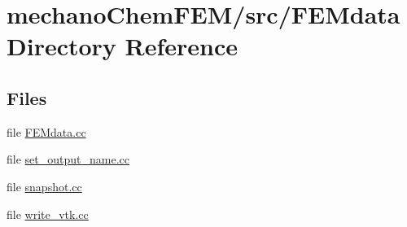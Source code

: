 \section{mechano\-Chem\-F\-E\-M/src/\-F\-E\-Mdata Directory Reference}
\label{dir_97da76cb69d6b32226d05cfade0f3c97}
\subsection*{Files}
\begin{DoxyCompactItemize}
\item 
file \hyperlink{_f_e_mdata_8cc}{F\-E\-Mdata.\-cc}
\item 
file \hyperlink{set__output__name_8cc}{set\-\_\-output\-\_\-name.\-cc}
\item 
file \hyperlink{snapshot_8cc}{snapshot.\-cc}
\item 
file \hyperlink{write__vtk_8cc}{write\-\_\-vtk.\-cc}
\end{DoxyCompactItemize}
